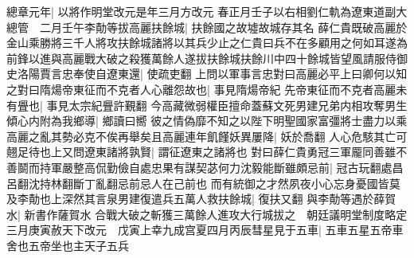 總章元年|{
	以將作明堂改元是年三月方改元}
春正月壬子以右相劉仁軌為遼東道副大總管　二月壬午李勣等拔高麗扶餘城|{
	扶餘國之故墟故城存其名}
薛仁貴既破高麗於金山乘勝將三千人將攻扶餘城諸將以其兵少止之仁貴曰兵不在多顧用之何如耳遂為前鋒以進與高麗戰大破之殺獲萬餘人遂拔扶餘城扶餘川中四十餘城皆望風請服侍御史洛陽賈言忠奉使自遼東還|{
	使疏吏翻}
上問以軍事言忠對曰高麗必平上曰卿何以知之對曰隋煬帝東征而不克者人心離怨故也|{
	事見隋煬帝紀}
先帝東征而不克者高麗未有舋也|{
	事見太宗紀舋許覲翻}
今高藏微弱權臣擅命蓋蘇文死男建兄弟内相攻奪男生傾心内附為我鄉導|{
	鄉讀曰嚮}
彼之情偽靡不知之以陛下明聖國家富彊將士盡力以乘高麗之亂其勢必克不俟再舉矣且高麗連年飢饉妖異屢降|{
	妖於喬翻}
人心危駭其亡可翹足待也上又問遼東諸將孰賢|{
	謂征遼東之諸將也}
對曰薛仁貴勇冠三軍龎同善雖不善鬬而持軍嚴整高侃勤儉自處忠果有謀契苾何力沈毅能斷雖頗忌前|{
	冠古玩翻處昌呂翻沈持林翻斷丁亂翻忌前忌人在己前也}
而有統御之才然夙夜小心忘身憂國皆莫及李勣也上深然其言泉男建復遣兵五萬人救扶餘城|{
	復扶又翻}
與李勣等遇於薛賀水|{
	新書作薩賀水}
合戰大破之斬獲三萬餘人進攻大行城拔之　朝廷議明堂制度略定三月庚寅赦天下改元　戊寅上幸九成宫夏四月丙辰彗星見于五車|{
	五車五星五帝車舍也五帝坐也主天子五兵}


